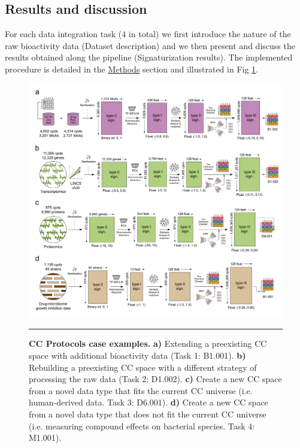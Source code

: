 \subsection{Results and discussion}


For each data integration task (4 in total) we first introduce the nature of the raw bioactivity data (Dataset description) and we then present and discuss the results obtained along the pipeline (Signaturization results). The implemented procedure is detailed in the \hyperref[Protocols_Methods]{Methods} section and illustrated in Fig \ref{Protocols_Fig2}.



\begin{figure}[t!]
  \centering
  \includegraphics[width=\linewidth]{figures/Protocols/Main/Pipeline_v6.png}
  \caption{
    \textbf{CC Protocols case examples.} 
    \textbf{a)} Extending a preexisting CC space with additional bioactivity data (Task 1: B1.001).
    \textbf{b)} Rebuilding a preexisting CC space with a different strategy of processing the raw data (Task 2: D1.002).
    \textbf{c)} Create a new CC space from a novel data type that fits the current CC universe (i.e. human-derived data. Task 3: D6.001). 
    \textbf{d)} Create a new CC space from a novel data type that does not fit the current CC universe (i.e. measuring compound effects on bacterial species. Task 4: M1.001).
  }
  \rule[0ex]{\textwidth}{0.5pt}
  \vspace{-5mm}
  \label{Protocols_Fig2}
\end{figure}


